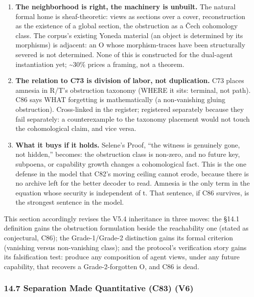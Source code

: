 \documentclass[
]{article}
\providecommand{\tightlist}{%
  \setlength{\itemsep}{0pt}\setlength{\parskip}{0pt}}
\begin{document}
\begin{enumerate}
\def\labelenumi{\arabic{enumi}.}
\tightlist
\item
  \textbf{The neighborhood is right, the machinery is unbuilt.} The
  natural formal home is sheaf-theoretic: views as sections over a
  cover, reconstruction as the existence of a global section, the
  obstruction as a Čech cohomology class. The corpus's existing Yoneda
  material (an object is determined by its morphisms) is adjacent: an O
  whose morphism-traces have been structurally severed is not
  determined. None of this is constructed for the dual-agent
  instantiation yet; \textasciitilde30\% prices a framing, not a
  theorem.
\item
  \textbf{The relation to C73 is division of labor, not duplication.}
  C73 places amnesia in R/T's obstruction taxonomy (WHERE it sits:
  terminal, not path). C86 says WHAT forgetting is mathematically (a
  non-vanishing gluing obstruction). Cross-linked in the register;
  registered separately because they fail separately: a counterexample
  to the taxonomy placement would not touch the cohomological claim, and
  vice versa.
\item
  \textbf{What it buys if it holds.} Selene's Proof, ``the witness is
  genuinely gone, not hidden,'' becomes: the obstruction class is
  non-zero, and no future key, subpoena, or capability growth changes a
  cohomological fact. This is the one defense in the model that C82's
  moving ceiling cannot erode, because there is no archive left for the
  better decoder to read. Amnesia is the only term in the equation whose
  security is independent of t. That sentence, if C86 survives, is the
  strongest sentence in the model.
\end{enumerate}

This section accordingly revises the V5.4 inheritance in three moves:
the §14.1 definition gains the obstruction formulation beside the
reachability one (stated as conjectural, C86); the Grade-1/Grade-2
distinction gains its formal criterion (vanishing versus non-vanishing
class); and the protocol's verification story gains its falsification
test: produce any composition of agent views, under any future
capability, that recovers a Grade-2-forgotten O, and C86 is dead.

\subsubsection{14.7 Separation Made Quantitative (C83)
(V6)}\label{separation-made-quantitative-c83-v6}
\end{document}
